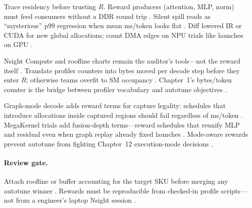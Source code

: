 Trace residency before trusting $R$. Reward producers (attention, MLP, norm) must feed consumers without a DDR round trip \citep{dao2022flashattention,yirage2026}. Silent spill reads as ``mysterious'' p99 regression when mean ms/token looks flat \citep{patel2025llminference,semianalysis2024tma}. Diff lowered IR or CUDA for new global allocations; count DMA edges on NPU trials like launches on GPU \citep{amd2024aie,amd2024xdna,chen2020compilerbasedhardw}.

Nsight Compute and roofline charts remain the auditor's tools---not the reward itself \citep{semianalysis2024tma,patel2025llminference,memoryfloor2026}. Translate profiler counters into bytes moved per decode step before they enter $R$; otherwise teams overfit to SM occupancy \citep{nvidia2022hopper,taxbreak2026,yirage2026,chen2020compilerbasedhardw,dlbook,kwon2023vllm,liu2024deepseekv3,amd2024xdna,amd2024aie,dao2022flashattention,dao2023flashdecoding,nvidia2024cudagraphs,memoryfloor2026}. Chapter~1's bytes/token counter is the bridge between profiler vocabulary and autotune objectives \citep{patel2025llminference,taxbreak2026,memoryfloor2026,yirage2026,chen2020compilerbasedhardw,dlbook}.

Graph-mode decode adds reward terms for capture legality: schedules that introduce allocations inside captured regions should fail regardless of ms/token \citep{nvidia2024cudagraphs,memoryfloor2026,kwon2023vllm,yirage2026,chen2020compilerbasedhardw,taxbreak2026,patel2025llminference,amd2024xdna,amd2024aie,semianalysis2024tma,dao2022flashattention,liu2024deepseekv3,dao2023flashdecoding,nvidia2022hopper,dlbook}. MegaKernel trials add fusion-depth terms---reward schedules that reunify MLP and residual even when graph replay already fixed launches \citep{yirage2026,chen2020compilerbasedhardw,memoryfloor2026,taxbreak2026,patel2025llminference,kwon2023vllm,amd2024aie,dlbook}. Mode-aware rewards prevent autotune from fighting Chapter~12 execution-mode decisions \citep{nvidia2024cudagraphs,yirage2026,chen2020compilerbasedhardw,memoryfloor2026,taxbreak2026,patel2025llminference,semianalysis2024tma,amd2024xdna,amd2024aie,dao2022flashattention,liu2024deepseekv3,dao2023flashdecoding,nvidia2022hopper,dlbook,kwon2023vllm}.

\paragraph{Review gate.} Attach roofline or buffer accounting for the target SKU before merging any autotune winner \citep{memoryfloor2026,yirage2026,semianalysis2024tma}. Rewards must be reproducible from checked-in profile scripts---not from a engineer's laptop Nsight session \citep{patel2025llminference,chen2020compilerbasedhardw}.

